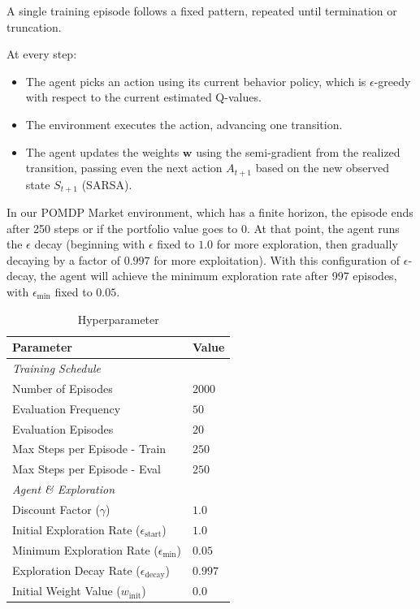 \documentclass[pdflatex,sn-mathphys-num]{sn-jnl}
\begin{document}
A single training episode follows a fixed pattern, repeated until termination or truncation.

At every step:
\begin{itemize}
    \item The agent picks an action using its current behavior policy, which is $\epsilon$-greedy with respect to the current estimated Q-values.
    \item The environment executes the action, advancing one transition.
    \item The agent updates the weights $\mathbf{w}$ using the semi-gradient from the realized transition, passing even the next action $A_{t+1}$ based on the new observed state $S_{t+1}$ (SARSA).
\end{itemize}

In our POMDP Market environment, which has a finite horizon, the episode ends after 250 steps or if the portfolio value goes to 0.
At that point, the agent runs the $\epsilon$ decay (beginning with $\epsilon$ fixed to $1.0$ for more exploration, then gradually decaying by a factor of $0.997$ for more exploitation). 
With this configuration of $\epsilon$-decay, the agent will achieve the minimum exploration rate after 997 episodes, with $\epsilon_{\min}$ fixed to $0.05$.
\begin{table}[htbp]
\centering
\caption{Hyperparameter}
\label{tab:hyperparameters}
\begin{tabular}{ll}
\hline
\textbf{Parameter} & \textbf{Value} \\ 
\hline
\multicolumn{2}{l}{\textit{Training Schedule}} \\
Number of Episodes & $2000$ \\
Evaluation Frequency& $50$ \\
Evaluation Episodes  & $20$ \\
Max Steps per Episode - Train  & $250$ \\
Max Steps per Episode - Eval & $250$ \\
\hline
\multicolumn{2}{l}{\textit{Agent \& Exploration}} \\
Discount Factor ($\gamma$) & $1.0$ \\
Initial Exploration Rate ($\epsilon_{\text{start}}$) & $1.0$ \\
Minimum Exploration Rate ($\epsilon_{\text{min}}$) & $0.05$ \\
Exploration Decay Rate ($\epsilon_{\text{decay}}$) & $0.997$ \\
Initial Weight Value ($w_{\text{init}}$) & $0.0$ \\
\hline
\end{tabular}
\end{table}
\end{document}
